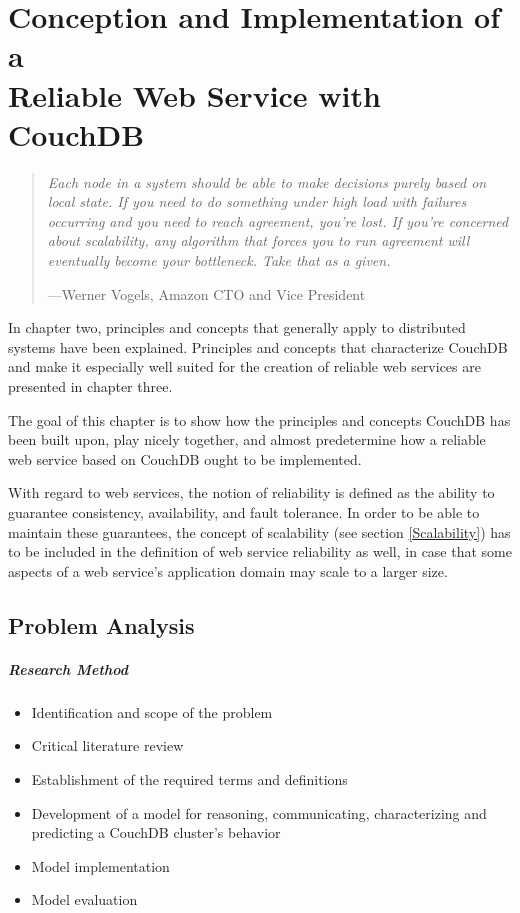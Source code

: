 \chapter[Conception and Implementation of a Reliable Web Service with CouchDB]{Conception and Implementation of a\\Reliable Web Service with CouchDB}

\begin{quote}
{\itshape
Each node in a system should be able to make decisions purely based on local state. If you need to do something under high load with failures occurring and you need to reach agreement, you're lost. If you're concerned about scalability, any algorithm that forces you to run agreement will eventually become your bottleneck. Take that as a given.
}

\hspace{1em}---Werner Vogels, Amazon CTO and Vice President \cite[p.~13]{ASL10}\\
\end{quote}

\noindent
In chapter two, principles and concepts that generally apply to distributed systems have been explained. Principles and concepts that characterize CouchDB and make it especially well suited for the creation of reliable web services are presented in chapter three.

The goal of this chapter is to show how the principles and concepts CouchDB has been built upon, play nicely together, and almost predetermine how a reliable web service based on CouchDB ought to be implemented.

With regard to web services, the notion of reliability is defined as the ability to guarantee consistency, availability, and fault tolerance. In order to be able to maintain these guarantees, the concept of scalability (see section \ref{Scalability}) has to be included in the definition of web service reliability as well, in case that some aspects of a web service's application domain may scale to a larger size.


\section{Problem Analysis}
\label{Problem Analysis}

\paragraph{Research Method}
\begin{itemize}
	\item Identification and scope of the problem
	\item Critical literature review
	\item Establishment of the required terms and definitions
	\item Development of a model for reasoning, communicating, characterizing and predicting a CouchDB cluster's behavior
	\item Model implementation
	\item Model evaluation
\end{itemize}

